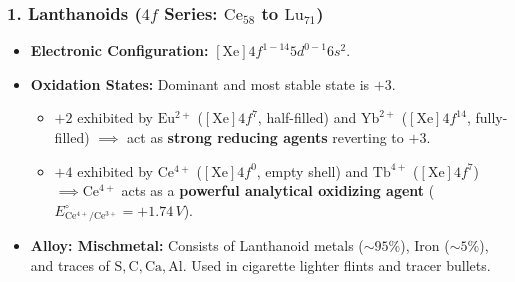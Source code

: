 \documentclass[10pt,a4paper]{article}
\begin{document}
\subsubsection{1. Lanthanoids ($4f$ Series: $\mathrm{Ce_{58}}$ to $\mathrm{Lu_{71}}$)}
\begin{itemize}
  \item \textbf{Electronic Configuration:} $[\mathrm{Xe}] 4f^{1-14} 5d^{0-1} 6s^2$.
  \item \textbf{Oxidation States:} Dominant and most stable state is \textbf{$+3$}.
  \begin{itemize}
    \item $+2$ exhibited by $\mathrm{Eu^{2+}}$ ($[\mathrm{Xe}] 4f^7$, half-filled) and $\mathrm{Yb^{2+}}$ ($[\mathrm{Xe}] 4f^{14}$, fully-filled) $\implies$ act as \textbf{strong reducing agents} reverting to $+3$.
    \item $+4$ exhibited by $\mathrm{Ce^{4+}}$ ($[\mathrm{Xe}] 4f^0$, empty shell) and $\mathrm{Tb^{4+}}$ ($[\mathrm{Xe}] 4f^7$) $\implies \mathbf{\mathrm{Ce^{4+}}}$ acts as a \textbf{powerful analytical oxidizing agent} ($E^\circ_{\mathrm{Ce^{4+}/Ce^{3+}}} = +1.74\,\si{V}$).
  \end{itemize}
  \item \textbf{Alloy: Mischmetal:} Consists of Lanthanoid metals ($\sim 95\%$), Iron ($\sim 5\%$), and traces of $\mathrm{S, C, Ca, Al}$. Used in cigarette lighter flints and tracer bullets.
\end{itemize}
\end{document}
